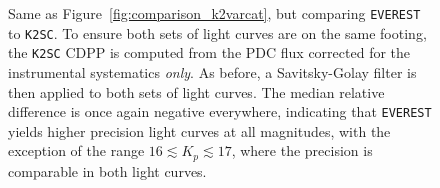 \documentclass[]{emulateapj}
\begin{document}
\begin{figure}[h]
  \begin{center}
       \caption{Same as Figure~\ref{fig:comparison_k2varcat}, but comparing 
                \texttt{EVEREST} to \texttt{K2SC}. To ensure both sets of light curves
                are on the same footing, the \texttt{K2SC} CDPP
                is computed from the PDC flux corrected for the instrumental 
                systematics \emph{only}. As before, a Savitsky-Golay filter
                is then applied to both sets of light curves. The median relative difference
                is once again negative everywhere, indicating that \texttt{EVEREST} yields higher
                precision light curves at all magnitudes, with the exception of the range $16 \lesssim K_p \lesssim 17$,
                where the precision is comparable in both light curves.}
     \label{fig:comparison_k2sc}
  \end{center}
\end{figure}

\pagebreak
\end{document}
